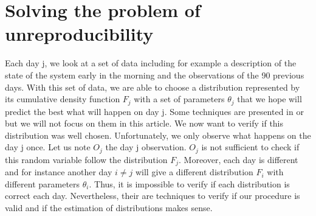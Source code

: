 \documentclass{article}
\begin{document}
   \section{Solving the problem of unreproducibility}
	Each day j, we look at a set of data including for example a description of the state of the system early in the morning and the observations of the 90 previous days. With this set of data, we are able to choose a distribution represented by its cumulative density function \begin{math}F_j\end{math} with a set of parameters \begin{math} \theta_j \end{math} that we hope will predict the best what will happen on day j. Some techniques are presented in \cite{vineconstruction} or \cite{fourcopulas} but we will not focus on them in this article. We now want to verify if this distribution was well chosen. \newline
	\newline
   Unfortunately, we only observe what happens on the day j once. Let us note \begin{math}O_j \end{math} the day j observation. \begin{math}O_j \end{math} is not sufficient to check if this random variable follow the distribution \begin{math} F_j \end{math}. Moreover, each day is different and for instance another day \begin{math}i\neq j\end{math}  will give a different distribution \begin{math} F_i \end{math} with different parameters \begin{math} \theta_i \end{math}. Thus, it is impossible to verify if each distribution is correct each day. Nevertheless, their are techniques to verify if our procedure is valid and if the estimation of distributions makes sense. \newline
   \newline
   
\end{document}
